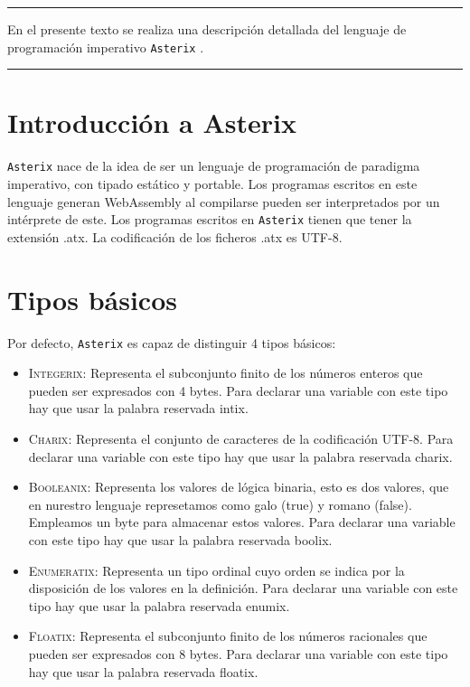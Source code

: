 \documentclass[a4paper, 10pt]{article}
\newcommand{\atx}{\texttt{Asterix} }
\begin{document}
    \begin{small}
        \hrule
        \vspace{\baselineskip}
        En el presente texto se realiza una descripción detallada del lenguaje
        de programación imperativo \atx. 
        \vspace{\baselineskip}\hrule
    \end{small}

    \section*{Introducción a Asterix}
    \atx nace de la idea de ser un lenguaje de programación de paradigma 
    imperativo, con tipado estático y portable. Los programas escritos en este
    lenguaje generan WebAssembly al compilarse pueden ser interpretados por 
    un intérprete de este. Los programas escritos en \atx tienen que
    tener la extensión .atx. La codificación de los ficheros .atx es UTF-8.

    \section*{Tipos básicos}
    Por defecto, \atx es capaz de distinguir 4 tipos básicos:
    \begin{itemize}
        \item \textsc{Integerix}: Representa el subconjunto finito de los números
            enteros que pueden ser expresados con 4 bytes. Para declarar una
            variable con este tipo hay que usar la palabra reservada \textsf{intix}.
        \item \textsc{Charix}: Representa el conjunto de caracteres de la
            codificación UTF-8. Para declarar una variable con este tipo hay
            que usar la palabra reservada \textsf{charix}.
        \item \textsc{Booleanix}: Representa los valores de lógica binaria, esto
            es dos valores, que en nurestro lenguaje represetamos como
            \textsf{galo} (true) y \textsf{romano} (false). Empleamos un byte
            para almacenar estos valores. Para declarar una variable con este
            tipo hay que usar la palabra reservada \textsf{boolix}.
        \item \textsc{Enumeratix}: Representa un tipo ordinal cuyo orden se indica por 
            la disposición de los valores en la definición. Para declarar una
            variable con este tipo hay que usar la palabra reservada \textsf{enumix}.
        \item \textsc{Floatix}: Representa el subconjunto finito de los números
            racionales que pueden ser expresados con 8 bytes. Para declarar una
            variable con este tipo hay que usar la palabra reservada \textsf{floatix}.
    \end{itemize}
\end{document}
